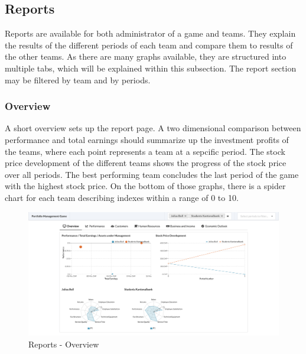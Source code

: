 \subsection{Reports}
Reports are available for both administrator of a game and teams. They explain the results of the different periods of each team and compare them to results of the other teams. As there are many graphs available, they are structured into multiple tabs, which will be explained within this subsection. The report section may be filtered by team and by periods.

\subsubsection{Overview}
A short overview sets up the report page. A two dimensional comparison between performance and total earnings should summarize up the investment profits of the teams, where each point represents a team at a sepcific period. The stock price development of the different teams shows the progress of the stock price over all periods. The best performing team concludes the last period of the game with the highest stock price. On the bottom of those graphs, there is a spider chart for each team describing indexes within a range of 0 to 10.
\begin{figure}[h!]
  \centering
  \includegraphics[scale=0.2]{img/application-overview/reports/01_overview.png}
  \caption{Reports - Overview}
\end{figure}

